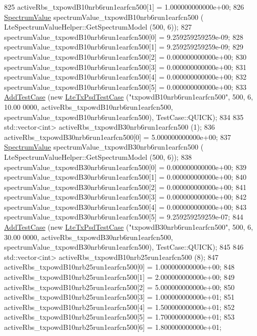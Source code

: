 \begin{DoxyCode}
825   activeRbs\_txpowdB10nrb6run1earfcn500[1] = 1.000000000000e+00;
826   \hyperlink{classns3_1_1SpectrumValue}{SpectrumValue} spectrumValue\_txpowdB10nrb6run1earfcn500 (
      LteSpectrumValueHelper::GetSpectrumModel (500, 6));
827   spectrumValue\_txpowdB10nrb6run1earfcn500[0] = 9.259259259259e-09;
828   spectrumValue\_txpowdB10nrb6run1earfcn500[1] = 9.259259259259e-09;
829   spectrumValue\_txpowdB10nrb6run1earfcn500[2] = 0.000000000000e+00;
830   spectrumValue\_txpowdB10nrb6run1earfcn500[3] = 0.000000000000e+00;
831   spectrumValue\_txpowdB10nrb6run1earfcn500[4] = 0.000000000000e+00;
832   spectrumValue\_txpowdB10nrb6run1earfcn500[5] = 0.000000000000e+00;
833   \hyperlink{classns3_1_1TestCase_a3718088e3eefd5d6454569d2e0ddd835}{AddTestCase} (\textcolor{keyword}{new} \hyperlink{classLteTxPsdTestCase}{LteTxPsdTestCase} (\textcolor{stringliteral}{"txpowdB10nrb6run1earfcn500"}, 500, 6, 10.00
      0000, activeRbs\_txpowdB10nrb6run1earfcn500, spectrumValue\_txpowdB10nrb6run1earfcn500), TestCase::QUICK);
834 
835   std::vector<int> activeRbs\_txpowdB30nrb6run1earfcn500 (1);
836   activeRbs\_txpowdB30nrb6run1earfcn500[0] = 5.000000000000e+00;
837   \hyperlink{classns3_1_1SpectrumValue}{SpectrumValue} spectrumValue\_txpowdB30nrb6run1earfcn500 (
      LteSpectrumValueHelper::GetSpectrumModel (500, 6));
838   spectrumValue\_txpowdB30nrb6run1earfcn500[0] = 0.000000000000e+00;
839   spectrumValue\_txpowdB30nrb6run1earfcn500[1] = 0.000000000000e+00;
840   spectrumValue\_txpowdB30nrb6run1earfcn500[2] = 0.000000000000e+00;
841   spectrumValue\_txpowdB30nrb6run1earfcn500[3] = 0.000000000000e+00;
842   spectrumValue\_txpowdB30nrb6run1earfcn500[4] = 0.000000000000e+00;
843   spectrumValue\_txpowdB30nrb6run1earfcn500[5] = 9.259259259259e-07;
844   \hyperlink{classns3_1_1TestCase_a3718088e3eefd5d6454569d2e0ddd835}{AddTestCase} (\textcolor{keyword}{new} \hyperlink{classLteTxPsdTestCase}{LteTxPsdTestCase} (\textcolor{stringliteral}{"txpowdB30nrb6run1earfcn500"}, 500, 6, 30.00
      0000, activeRbs\_txpowdB30nrb6run1earfcn500, spectrumValue\_txpowdB30nrb6run1earfcn500), TestCase::QUICK);
845 
846   std::vector<int> activeRbs\_txpowdB10nrb25run1earfcn500 (8);
847   activeRbs\_txpowdB10nrb25run1earfcn500[0] = 1.000000000000e+00;
848   activeRbs\_txpowdB10nrb25run1earfcn500[1] = 2.000000000000e+00;
849   activeRbs\_txpowdB10nrb25run1earfcn500[2] = 5.000000000000e+00;
850   activeRbs\_txpowdB10nrb25run1earfcn500[3] = 1.000000000000e+01;
851   activeRbs\_txpowdB10nrb25run1earfcn500[4] = 1.500000000000e+01;
852   activeRbs\_txpowdB10nrb25run1earfcn500[5] = 1.700000000000e+01;
853   activeRbs\_txpowdB10nrb25run1earfcn500[6] = 1.800000000000e+01;

\end{DoxyCode}

